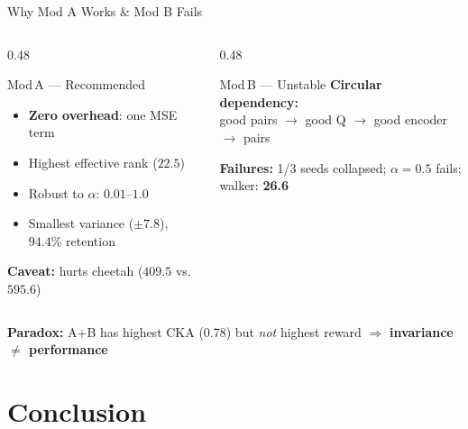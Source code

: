 \documentclass[aspectratio=169]{beamer}
\newcommand{\highlight}[1]{\textcolor{AccentOrange}{\textbf{#1}}}
\newcommand{\good}[1]{\textcolor{SuccessGreen}{\textbf{#1}}}
\newcommand{\bad}[1]{\textcolor{DangerRed}{\textbf{#1}}}
\begin{document}
\begin{frame}[shrink=5]{Why Mod A Works \& Mod B Fails}

\small
\begin{columns}[T]
\begin{column}{0.48\textwidth}
\begin{exampleblock}{\centering Mod\,A --- Recommended}
\begin{itemize}\setlength{\itemsep}{1pt}
    \item \good{Zero overhead}: one MSE term
    \item Highest effective rank ($22.5$)
    \item Robust to $\alpha$: $0.01$--$1.0$
    \item Smallest variance ($\pm 7.8$), $94.4\%$ retention
\end{itemize}
{\footnotesize \textbf{Caveat:} hurts cheetah ($409.5$ vs.\ $595.6$)}
\end{exampleblock}
\end{column}
\begin{column}{0.48\textwidth}
\begin{alertblock}{\centering Mod\,B --- Unstable}
\textbf{Circular dependency:}\\
good pairs $\to$ good Q $\to$ good encoder $\to$ pairs

\vspace{0.1em}
\textbf{Failures:} 1/3 seeds collapsed; $\alpha{=}0.5$ fails; walker: \bad{26.6}
\end{alertblock}
\end{column}
\end{columns}

\vspace{0.2em}
\centering\small
\highlight{Paradox:} A+B has highest CKA (0.78) but \emph{not} highest reward \;$\Rightarrow$\; \textbf{invariance $\neq$ performance}
\end{frame}

\section{Conclusion}
\end{document}
